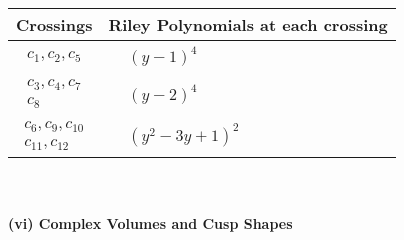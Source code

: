 \documentclass[1p]{elsarticle_modified}
\theoremstyle{definition}
\begin{document}
\begin{tabular}{m{50pt}|m{274pt}}
Crossings & \hspace{64pt}Riley Polynomials at each crossing \\
\hline $$\begin{aligned}c_{1},c_{2},c_{5}\end{aligned}$$&$\begin{aligned}
&(y-1)^4
\end{aligned}$\\
\hline $$\begin{aligned}c_{3},c_{4},c_{7}\\c_{8}\end{aligned}$$&$\begin{aligned}
&(y-2)^4
\end{aligned}$\\
\hline $$\begin{aligned}c_{6},c_{9},c_{10}\\c_{11},c_{12}\end{aligned}$$&$\begin{aligned}
&(y^2-3 y+1)^2
\end{aligned}$\\
\hline
\end{tabular}\\~\\
\newpage\flushleft \textbf{(vi) Complex Volumes and Cusp Shapes}
\end{document}
